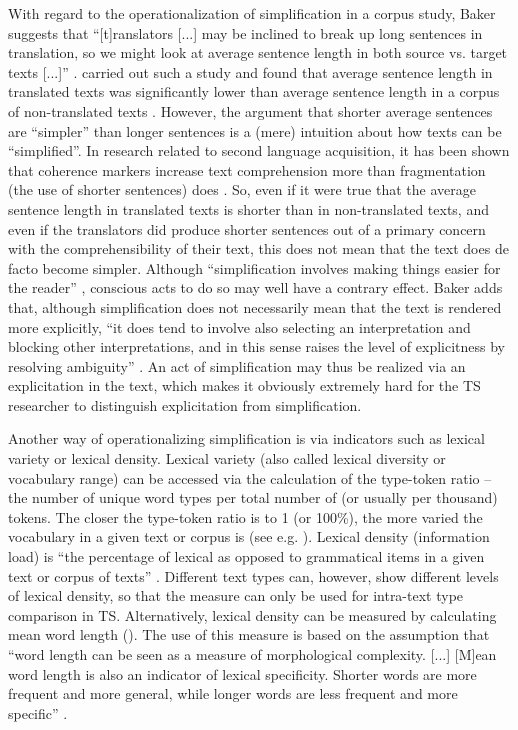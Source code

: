 With regard to the operationalization of simplification in a corpus study, Baker suggests that “[t]ranslators [...] may be inclined to break up long sentences in translation, so we might look at average sentence length in both source vs. target texts [...]”  \citep[181]{Baker1996}. \citet{thelen_comparable_1996} carried out such a study and found that average sentence length in translated texts was significantly lower than average sentence length in a corpus of non-translated texts  \citep[181]{Baker1996}. However, the argument that shorter average sentences are “simpler” than longer sentences is a (mere) intuition about how texts can be “simplified”. In research related to second language acquisition, it has been shown that coherence markers increase text comprehension more than fragmentation (the use of shorter sentences) does \citep{land_zwakke_2009}. So, even if it were true that the average sentence length in translated texts is shorter than in non-translated texts, and even if the translators did produce shorter sentences out of a primary concern with the comprehensibility of their text, this does not mean that the text does de facto become simpler. Although “simplification involves making things easier for the reader”  \citep[182]{Baker1996}, conscious acts to do so may well have a contrary effect. Baker adds that, although simplification does not necessarily mean that the text is rendered more explicitly, “it does tend to involve also selecting an interpretation and blocking other interpretations, and in this sense raises the level of explicitness by resolving ambiguity”  \citep[182]{Baker1996}. An act of simplification may thus be realized via an explicitation in the text, which makes it obviously extremely hard for the TS researcher to distinguish explicitation from simplification.



Another way of operationalizing simplification is via indicators such as lexical variety or lexical density. Lexical variety (also called lexical diversity or vocabulary range) can be accessed via the calculation of the type-token ratio – the number of unique word types per total number of (or usually per thousand) tokens. The closer the type-token ratio is to 1 (or 100\%), the more varied the vocabulary in a given text or corpus is (see e.g. \citealt{laviosa_core_1998}). Lexical density (information load) is “the percentage of lexical as opposed to grammatical items in a given text or corpus of texts” \citep[237]{baker_corpora_1995}. Different text types can, however, show different levels of lexical density, so that the measure can only be used for intra-text type comparison in TS. Alternatively, lexical density can be measured by calculating mean word length (\citealt{kruger_register_2012}). The use of this measure is based on the assumption that “word length can be seen as a measure of morphological complexity. [...] [M]ean word length is also an indicator of lexical specificity. Shorter words are more frequent and more general, while longer words are less frequent and more specific” \citep[366]{kruger_corpus-based_2012}.



